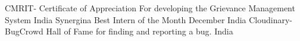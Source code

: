 


\begin{cvhonors}

%   
  \cvhonor
    {CMRIT- Certificate of Appreciation} %
    {For developing the Grievance Management System} %
    {India} %
    {} %
  \cvhonor
    {Synergina} %
    {Best Intern of the Month December} %
    {India} %
    {} %
  \cvhonor
    {Cloudinary- BugCrowd} %
    {Hall of Fame for finding and reporting a bug.} %
    {India} %
    {} %
\end{cvhonors}